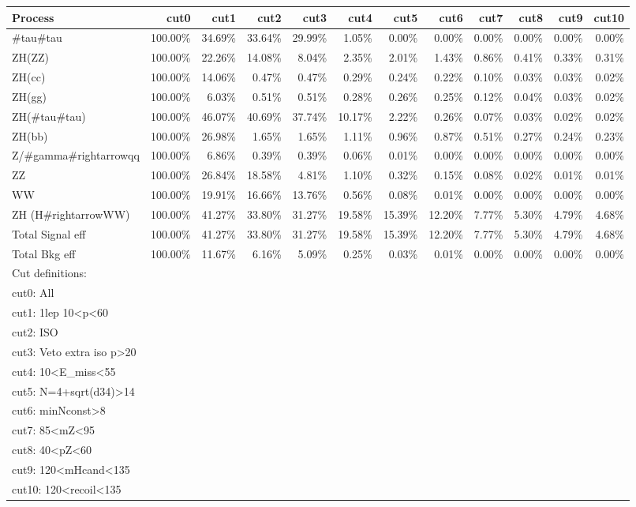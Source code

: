 \begin{tabular}{lrrrrrrrrrrr}
\hline
Process & cut0 & cut1 & cut2 & cut3 & cut4 & cut5 & cut6 & cut7 & cut8 & cut9 & cut10 \\
\hline
#tau#tau & 100.00\% & 34.69\% & 33.64\% & 29.99\% & 1.05\% & 0.00\% & 0.00\% & 0.00\% & 0.00\% & 0.00\% & 0.00\% \\
ZH(ZZ) & 100.00\% & 22.26\% & 14.08\% & 8.04\% & 2.35\% & 2.01\% & 1.43\% & 0.86\% & 0.41\% & 0.33\% & 0.31\% \\
ZH(cc) & 100.00\% & 14.06\% & 0.47\% & 0.47\% & 0.29\% & 0.24\% & 0.22\% & 0.10\% & 0.03\% & 0.03\% & 0.02\% \\
ZH(gg) & 100.00\% & 6.03\% & 0.51\% & 0.51\% & 0.28\% & 0.26\% & 0.25\% & 0.12\% & 0.04\% & 0.03\% & 0.02\% \\
ZH(#tau#tau) & 100.00\% & 46.07\% & 40.69\% & 37.74\% & 10.17\% & 2.22\% & 0.26\% & 0.07\% & 0.03\% & 0.02\% & 0.02\% \\
ZH(bb) & 100.00\% & 26.98\% & 1.65\% & 1.65\% & 1.11\% & 0.96\% & 0.87\% & 0.51\% & 0.27\% & 0.24\% & 0.23\% \\
Z/#gamma#rightarrowqq & 100.00\% & 6.86\% & 0.39\% & 0.39\% & 0.06\% & 0.01\% & 0.00\% & 0.00\% & 0.00\% & 0.00\% & 0.00\% \\
ZZ & 100.00\% & 26.84\% & 18.58\% & 4.81\% & 1.10\% & 0.32\% & 0.15\% & 0.08\% & 0.02\% & 0.01\% & 0.01\% \\
WW & 100.00\% & 19.91\% & 16.66\% & 13.76\% & 0.56\% & 0.08\% & 0.01\% & 0.00\% & 0.00\% & 0.00\% & 0.00\% \\
ZH (H#rightarrowWW) & 100.00\% & 41.27\% & 33.80\% & 31.27\% & 19.58\% & 15.39\% & 12.20\% & 7.77\% & 5.30\% & 4.79\% & 4.68\% \\
\hline
Total Signal eff & 100.00\% & 41.27\% & 33.80\% & 31.27\% & 19.58\% & 15.39\% & 12.20\% & 7.77\% & 5.30\% & 4.79\% & 4.68\% \\
Total Bkg eff & 100.00\% & 11.67\% & 6.16\% & 5.09\% & 0.25\% & 0.03\% & 0.01\% & 0.00\% & 0.00\% & 0.00\% & 0.00\% \\
\hline
\multicolumn{12}{l}{Cut definitions:} \\
\multicolumn{12}{l}{cut0: All} \\
\multicolumn{12}{l}{cut1: 1lep 10<p<60} \\
\multicolumn{12}{l}{cut2: ISO} \\
\multicolumn{12}{l}{cut3: Veto extra iso p>20} \\
\multicolumn{12}{l}{cut4: 10<E\_{miss}<55} \\
\multicolumn{12}{l}{cut5: N=4+sqrt(d34)>14} \\
\multicolumn{12}{l}{cut6: minNconst>8} \\
\multicolumn{12}{l}{cut7: 85<mZ<95} \\
\multicolumn{12}{l}{cut8: 40<pZ<60} \\
\multicolumn{12}{l}{cut9: 120<mHcand<135} \\
\multicolumn{12}{l}{cut10: 120<recoil<135} \\
\hline
\end{tabular}
